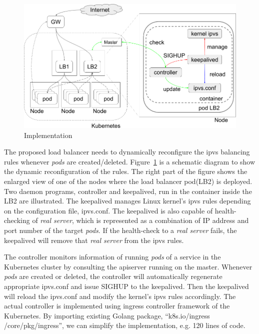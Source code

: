 \begin{figure}
\includegraphics[width=\columnwidth]{Figs/ipvs-ingress-schem}
\caption{Implementation}
\label{fig:ipvs-ingress-schem}
\end{figure}

The proposed load balancer needs to dynamically reconfigure the ipvs balancing rules whenever {\em pods} are created/deleted. 
Figure~\ref{fig:ipvs-ingress-schem} is a schematic diagram to show the dynamic reconfiguration of the rules.
The right part of the figure shows the enlarged view of one of the nodes where the load balancer pod(LB2) is deployed.
Two daemon programs, controller and keepalived, run in the container inside the LB2 are illustrated.
The keepalived manages Linux kernel's ipvs rules depending on the configuration file, ipvs.conf.
The keepalived is also capable of health-checking of {\em real server}, 
which is represented as a combination of IP address and port number of the target {\em pods}. 
If the health-check to a {\em real server} fails, the keepalived will remove that {\em real server} from the ipvs rules.

The controller monitors information of running {\em pods} of a service in the Kubernetes cluster by consulting the apiserver running on the master.
Whenever {\em pods} are created or deleted, the controller will automatically regenerate appropriate ipvs.conf and issue SIGHUP to the keepalived.
Then the keepalived will reload the ipvs.conf and modify the kernel's ipvs rules accordingly.  
The actual controller\cite{ktaka_ccmp_2017_826894} is implemented using ingress controller\cite{K8sIngress2017} framework of the Kubernetes. 
By importing existing Golang package, \enquote{k8s.io/ingress /core/pkg/ingress}, we can simplify the implementation, e.g. 
120 lines of code.  

